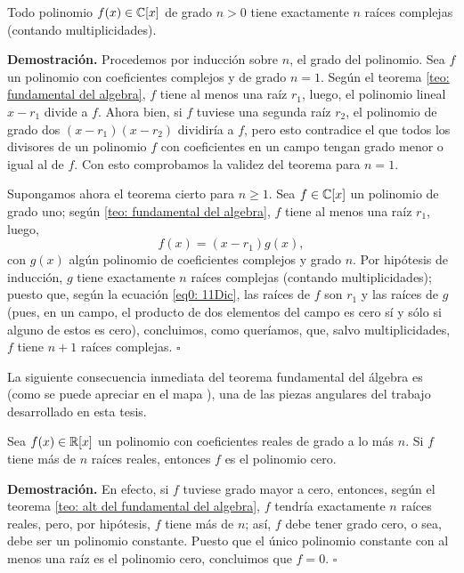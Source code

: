 \begin{teo}
\label{teo: alt del fundamental del algebra}
Todo polinomio $f(x) \in \mathbb{C}[x]$ 
de grado $n>0$
tiene exactamente $n$ raíces complejas
(contando multiplicidades).
\end{teo}
\noindent
\textbf{Demostración.}
Procedemos por inducción sobre $n$, el grado del polinomio.
Sea $f$ un polinomio con coeficientes
complejos y de grado $n=1$. Según el teorema 
\ref{teo: fundamental del algebra}, $f$ tiene al menos
una raíz $r_{1}$, luego,
el polinomio lineal $x-r_{1}$
divide a $f$. Ahora bien, si $f$ tuviese una segunda
raíz $r_{2}$, el polinomio 
de grado dos $(x-r_{1})(x-r_{2})$
dividiría a $f$, pero esto contradice el que 
todos los divisores de un polinomio $f$ con coeficientes
en un campo tengan grado menor o igual al de $f$. 
Con esto comprobamos la validez del teorema para $n=1$.

Supongamos ahora el teorema cierto para $n \geq 1$.
Sea $f \in \mathbb{C}[x]$ un polinomio de grado uno; según 
\ref{teo: fundamental del algebra}, $f$ tiene al menos
una raíz $r_{1}$, luego,
\begin{equation}
\label{eq0: 11Dic}
f(x)= (x-r_{1}) g(x), 
\end{equation}
con $g(x)$ algún polinomio de coeficientes complejos y grado
$n$. Por hipótesis de inducción, $g$ tiene exactamente
$n$ raíces complejas (contando multiplicidades); puesto que,
según la ecuación \eqref{eq0: 11Dic}, las raíces de $f$
son $r_{1}$ y las raíces de $g$ (pues, en un campo, el producto
de dos elementos del campo es cero sí y sólo si alguno de 
estos es cero), concluimos, como queríamos, que, salvo
multiplicidades, $f$ tiene $n+1$ raíces complejas.
\null\nobreak\hfill\ensuremath{\square} %
\vspace{0.2cm}

La siguiente consecuencia inmediata del teorema fundamental del
álgebra es (como se puede apreciar en el mapa ),
una de las piezas angulares del trabajo desarrollado en esta tesis.

\begin{prop}
\label{prop: cita TFA}
Sea $f(x) \in \mathbb{R}[x]$ un polinomio con coeficientes reales
de grado a lo más $n$. Si $f$ tiene más de $n$ raíces reales, entonces
$f$ es el polinomio cero.
\end{prop}
\noindent
\textbf{Demostración.}
En efecto, si $f$ tuviese grado mayor a cero, entonces, 
según el teorema \ref{teo: alt del fundamental del algebra},
$f$ tendría exactamente $n$ raíces reales,
pero, por hipótesis, $f$ tiene más de $n$; así, $f$
debe tener grado cero, o sea, debe  ser un polinomio constante.
Puesto que el único polinomio constante con al menos una raíz
es el polinomio cero, concluimos que $f=0$.
\null\nobreak\hfill\ensuremath{\square} %
\vspace{0.2cm}